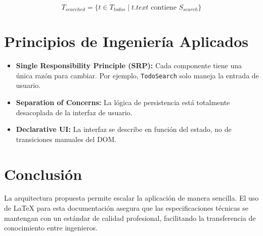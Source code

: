\documentclass[12pt,a4paper]{article}
\begin{document}
\begin{equation}
T_{searched} = \{ t \in T_{todos} \mid t.text \text{ contiene } S_{search} \}
\end{equation}

\section{Principios de Ingeniería Aplicados}
\begin{itemize}
    \item \textbf{Single Responsibility Principle (SRP):} Cada componente tiene una única razón para cambiar. Por ejemplo, \texttt{TodoSearch} solo maneja la entrada de usuario.
    \item \textbf{Separation of Concerns:} La lógica de persistencia está totalmente desacoplada de la interfaz de usuario.
    \item \textbf{Declarative UI:} La interfaz se describe en función del estado, no de transiciones manuales del DOM.
\end{itemize}

\section{Conclusión}
La arquitectura propuesta permite escalar la aplicación de manera sencilla. El uso de LaTeX para esta documentación asegura que las especificaciones técnicas se mantengan con un estándar de calidad profesional, facilitando la transferencia de conocimiento entre ingenieros.
\end{document}
